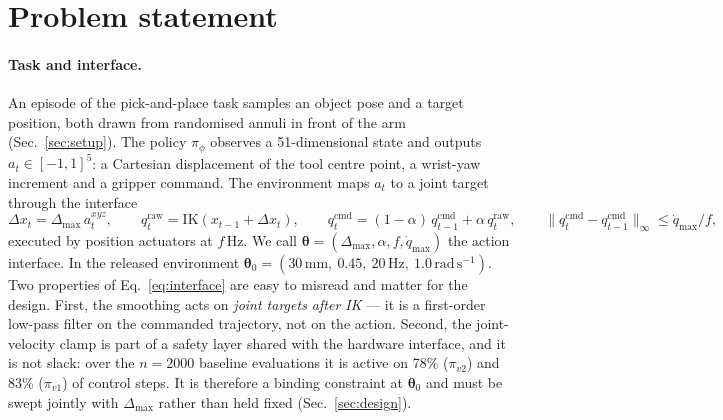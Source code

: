 \documentclass{article}
\newcommand{\dmax}{\Delta_{\max}}
\newcommand{\qdmax}{\dot q_{\max}}
\newcommand{\iface}{\boldsymbol{\theta}}
\begin{document}
\section{Problem statement}
\label{sec:problem}

\paragraph{Task and interface.}
An episode of the pick-and-place task samples an object pose and a target
position, both drawn from randomised annuli in front of the arm
(Sec.~\ref{sec:setup}). The policy $\pi_\phi$ observes a 51-dimensional state
and outputs $a_t \in [-1,1]^5$: a Cartesian displacement of the tool centre
point, a wrist-yaw increment and a gripper command. The environment maps $a_t$
to a joint target through the interface
\begin{equation}
  \Delta x_t = \dmax\, a_t^{xyz},\qquad
  q^{\mathrm{raw}}_t = \mathrm{IK}(x_{t-1} + \Delta x_t),\qquad
  q^{\mathrm{cmd}}_t = (1-\alpha)\, q^{\mathrm{cmd}}_{t-1} + \alpha\, q^{\mathrm{raw}}_t,\qquad
  \|q^{\mathrm{cmd}}_t - q^{\mathrm{cmd}}_{t-1}\|_\infty \le \qdmax / f,
  \label{eq:interface}
\end{equation}
executed by position actuators at $f$\,Hz. We call $\iface = (\dmax,\alpha,f,\qdmax)$
the action interface. In the released environment
$\iface_0 = (30\,\mathrm{mm},\ 0.45,\ 20\,\mathrm{Hz},\ 1.0\,\mathrm{rad\,s^{-1}})$.
Two properties of Eq.~\ref{eq:interface} are easy to misread and matter for the
design. First, the smoothing acts on \emph{joint targets after IK} --- it is a
first-order low-pass filter on the commanded trajectory, not on the action.
Second, the joint-velocity clamp is part of a safety layer shared with the
hardware interface, and it is not slack: over the $n{=}2000$ baseline
evaluations it is active on 78\% (\(\pi_{v2}\)) and 83\% (\(\pi_{v1}\)) of
control steps. It is therefore a binding constraint at $\iface_0$ and must be
swept jointly with $\dmax$ rather than held fixed (Sec.~\ref{sec:design}).
\end{document}

